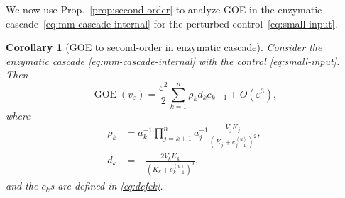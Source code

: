 \documentclass[onecolumn]{IEEEtran}
\newcommand{\GOE}{\operatorname{GOE}}
\newcommand{\avg}[1]{\left\langle #1\right\rangle}
\newtheorem{corollary}[theorem]{Corollary}
\begin{document}
We now use Prop.~\ref{prop:second-order}
to analyze  GOE in the enzymatic cascade~\eqref{eq:mm-cascade-internal} 
for     the perturbed control~\eqref{eq:small-input}. 
 

\begin{corollary}[GOE to second-order in enzymatic cascade]
Consider the enzymatic cascade
\eqref{eq:mm-cascade-internal}   with the control   \eqref{eq:small-input}. Then 
\begin{equation}
    \GOE(v_\varepsilon)
    =
    \frac{\varepsilon^2}{2}
    \sum_{k=1}^n
    \rho_kd_kc_{k-1}
    +
    O(\varepsilon^3),
\end{equation}
where
 \begin{align}\label{eq:rhoke}
     \rho_k
    &=
    a_k^{-1}
    \prod_{j=k+1}^n a_j^{-1} \frac{V_j K_j}{(K_j+e_{j-1}^{\avg u})^2}  ,\nonumber\\
  d_k& = -\frac{2V_k K_k}{(K_k+e_{k-1}^{\avg u})^3}, 
\end{align}
and the $c_k$s are defined in \eqref{eq:defck}.
\end{corollary}
\end{document}
